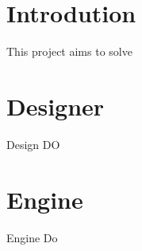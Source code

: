 \section{Introdution}
This project aims to solve
\section{Designer}
Design DO
\section{Engine}
Engine Do